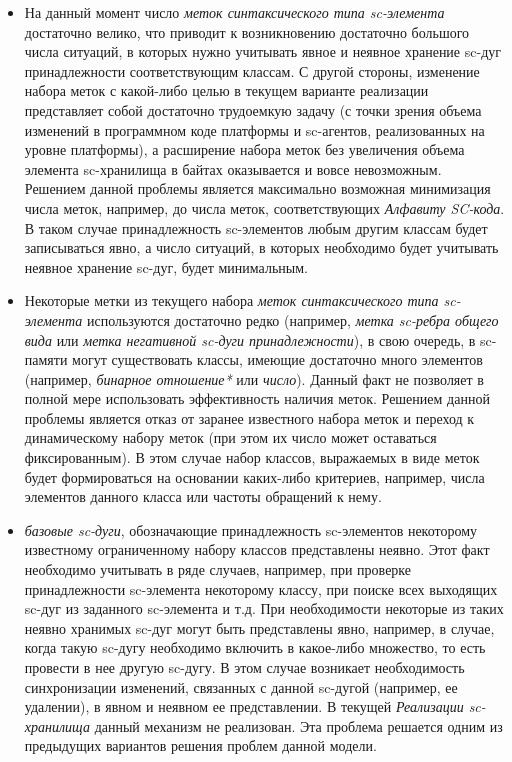 \begin{itemize}
    \item На данный момент число \textit{меток синтаксического типа sc-элемента} достаточно велико, что приводит к
    возникновению достаточно большого числа ситуаций, в которых нужно учитывать явное и неявное хранение sc-дуг
    принадлежности соответствующим классам. С другой стороны, изменение набора меток с какой-либо целью в текущем
    варианте реализации представляет собой достаточно трудоемкую задачу (с точки зрения объема изменений в программном
    коде платформы и sc-агентов, реализованных на уровне платформы), а расширение набора меток без увеличения объема
    элемента sc-хранилища в байтах оказывается и вовсе невозможным. Решением данной проблемы является максимально
    возможная минимизация числа меток, например, до числа меток, соответствующих \textit{Алфавиту SC-кода}. В таком
    случае принадлежность sc-элементов любым другим классам будет записываться явно, а число ситуаций, в которых
    необходимо будет учитывать неявное хранение sc-дуг, будет минимальным.
    \item Некоторые метки из текущего набора \textit{меток синтаксического типа sc-элемента} используются достаточно
    редко (например, \textit{метка sc-ребра общего вида} или \textit{метка негативной sc-дуги принадлежности}), в
    свою очередь, в sc-памяти могут существовать классы, имеющие достаточно много элементов (например, \textit{бинарное
    отношение*} или \textit{число}). Данный факт не позволяет в полной мере использовать эффективность наличия меток.
    Решением данной проблемы является отказ от заранее известного набора меток и переход к динамическому набору
    меток (при этом их число может оставаться фиксированным). В этом случае набор классов, выражаемых в виде меток
    будет формироваться на основании каких-либо критериев, например, числа элементов данного класса или частоты обращений
    к нему.
    \item \textit{базовые sc-дуги}, обозначающие принадлежность sc-элементов некоторому известному ограниченному
    набору классов представлены неявно. Этот факт необходимо учитывать в ряде случаев, например, при проверке принадлежности
    sc-элемента некоторому классу, при поиске всех выходящих sc-дуг из заданного sc-элемента и т.д.
    При необходимости некоторые из таких неявно хранимых sc-дуг могут быть представлены явно, например, в случае, когда
    такую sc-дугу необходимо включить в какое-либо множество, то есть провести в нее другую sc-дугу. В этом случае возникает
    необходимость синхронизации изменений, связанных с данной sc-дугой (например, ее удалении), в явном и неявном ее
    представлении. В текущей \textit{Реализации sc-хранилища} данный механизм не реализован. Эта проблема решается
    одним из предыдущих вариантов решения проблем данной модели.
\end{itemize}

